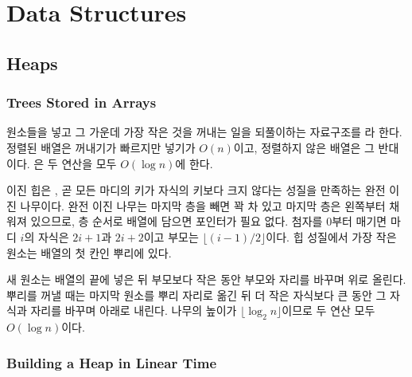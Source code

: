 \chapter{Data Structures}
\label{ch:data-structures}


\section{Heaps}
\label{sec:heap}

\subsection{Trees Stored in Arrays}

원소들을 넣고 그 가운데 가장 작은 것을 꺼내는 일을 되풀이하는 자료구조를 라 한다. 정렬된 배열은 꺼내기가 빠르지만 넣기가 $O(n)$이고, 정렬하지 않은 배열은 그 반대이다. 은 두 연산을 모두 $O(\log n)$에 한다.

이진 힙은 , 곧 모든 마디의 키가 자식의 키보다 크지 않다는 성질을 만족하는 완전 이진 나무이다. 완전 이진 나무는 마지막 층을 빼면 꽉 차 있고 마지막 층은 왼쪽부터 채워져 있으므로, 층 순서로 배열에 담으면 포인터가 필요 없다. 첨자를 $0$부터 매기면 마디 $i$의 자식은 $2i+1$과 $2i+2$이고 부모는 $\lfloor(i-1)/2\rfloor$이다. 힙 성질에서 가장 작은 원소는 배열의 첫 칸인 뿌리에 있다.

새 원소는 배열의 끝에 넣은 뒤 부모보다 작은 동안 부모와 자리를 바꾸며 위로 올린다. 뿌리를 꺼낼 때는 마지막 원소를 뿌리 자리로 옮긴 뒤 더 작은 자식보다 큰 동안 그 자식과 자리를 바꾸며 아래로 내린다. 나무의 높이가 $\lfloor\log_2n\rfloor$이므로 두 연산 모두 $O(\log n)$이다.

\subsection{Building a Heap in Linear Time}

